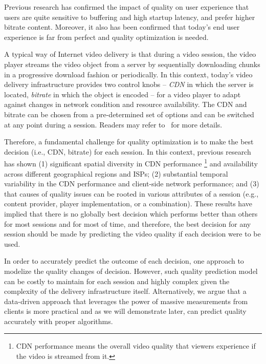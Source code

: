 




 Previous research has confirmed the impact of quality on user experience that users are quite sensitive to buffering and high startup latency, and prefer higher bitrate content. Moreover, it also has been confirmed that today's end user experience is far from perfect and quality optimization is needed\cite{sigcomm12,conext13}.

 A typical way of Internet video delivery is that during a video session, the video player streams the video object from a server by sequentially downloading chunks in a progressive download fashion or periodically. In this context, today's video delivery infrastructure provides two control knobs -- {\it CDN} in which the server is located, {\it bitrate} in which the object is encoded -- for a video player to adapt against changes in network condition and resource availability. The CDN and bitrate can be chosen from a pre-determined set of options and can be switched at any point during a session. Readers may refer to~\cite{conext12} for more details. 

 Therefore, a fundamental challenge for quality optimization is to make the best decision (i.e., CDN, bitrate) for each session. In this context, previous research \cite{sigcomm12,conext13} has shown (1) significant spatial diversity in CDN performance \footnote{CDN performance means the overall video quality that viewers experience if the video is streamed from it.} and availability across different geographical regions and ISPs; (2) substantial temporal variability in the CDN performance and client-side network performance; and (3) that causes of quality issues can be rooted in various attributes of a session (e.g., content provider, player implementation, or a combination). These results have implied that there is no globally best decision which performs better than others for most sessions and for most of time, and therefore, the best decision for any session should be made by predicting the video quality if each decision were to be used. 

 In order to accurately predict the outcome of each decision, one approach to modelize the quality changes of decision. However, such quality prediction model can be costly to maintain for each session and highly complex given the complexity of the delivery infrastructure itself. Alternatively, we argue that a data-driven approach that leverages the power of massive measurements from clients is more practical and as we will demonstrate later, can predict quality accurately with proper algorithms.


